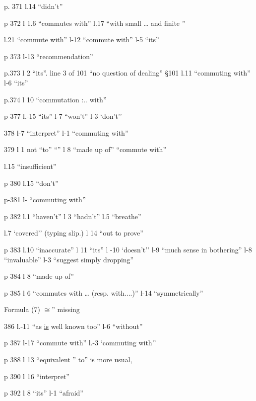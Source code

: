 
p. 371 l.14 ``didn't''

p 372 l 1.6 ``commutes with'' \quad l.17 ``with small \ldots{} and finite ''

l.21 ``commute with'' \quad l-12 ``commute with'' \quad l-5 ``its''

p 373 l-13 ``recommendation''

p.373 l 2 ``its''. \quad line 3 of 101 ``no question of dealing'' \quad \S101 l.11 ``commuting with'' \quad l-6 ``its''

p.374 l 10 ``commutation :.. with''

p 377 l.-15 ``its'' \quad l-7 ``won't'' \quad l-3 `don't'' 

378 l-7 ``interpret'' \quad l-1 ``commuting with''

379 l 1 not ``to'' ``'' \quad l 8 ``made up of'' \quad ``commute with''

l.15 ``insufficient''

p 380 l.15 ``don't''

p-381 l- ``commuting with''

p 382 l.1 ``haven't'' \quad l 3 ``hadn't'' \quad l.5 ``breathe''

l.7 `covered'' (typing slip.) \quad l 14 ``out to prove''

p 383 l.10 ``inaccurate'' \quad l 11 ``its'' \quad l -10 `doesn't'' \quad l-9 ``much sense in bothering'' \quad l-8 ``invaluable'' \quad l-3 ``suggest simply dropping''

p 384 l 8 ``made up of''

p 385 l 6 ``commutes with \ldots{} (resp. with....)'' \quad l-14 ``symmetrically''

Formula (7) $\cong$'' missing

386 l.-11 ``as \uline{is} well known too'' \quad l-6 ``without''

p 387 l-17 ``commute with'' \quad l.-3 `commuting with''

p 388 l 13 ``equivalent '' to'' is more usual,

p 390 l 16 ``interpret''

p 392 l 8 ``its'' \quad l-1 ``afraid''

